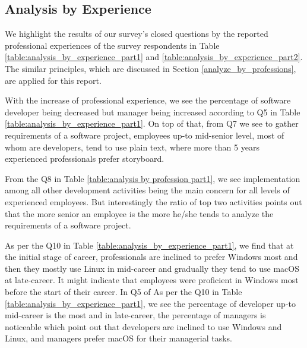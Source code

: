 \subsection{Analysis by Experience}

We highlight the results of our survey's closed questions by the reported professional experiences of the survey respondents in Table \ref{table:analysis_by_experience_part1} and \ref{table:analysis_by_experience_part2}. The similar principles, which are discussed in Section \ref{analyze_by_professions}, are applied for this report.




With the increase of professional experience, we see the percentage of software developer being decreased but manager being increased according to Q5 in Table \ref{table:analysis_by_experience_part1}. On top of that, from Q7 we see to gather requirements of a software project, employees up-to mid-senior level, most of whom are developers, tend to use plain text, where more than 5 years experienced professionals prefer storyboard.

From the Q8 in Table \ref{table:analysis by profession part1}, we see implementation among all other development activities being the main concern for all levels of experienced employees. But interestingly the ratio of top two activities points out that the more senior an employee is the more he/she tends to analyze the requirements of a software project.

As per the Q10 in Table \ref{table:analysis_by_experience_part1}, we find that at the initial stage of career, professionals are inclined to prefer Windows most and then they mostly use Linux in mid-career and gradually they tend to use macOS at late-career. It might indicate that employees were proficient in Windows most before the start of their career. In Q5 of As per the Q10 in Table \ref{table:analysis_by_experience_part1}, we see the percentage of developer up-to mid-career is the most and in late-career, the percentage of managers is noticeable which point out that developers are inclined to use Windows and Linux, and managers prefer macOS for their managerial tasks.


